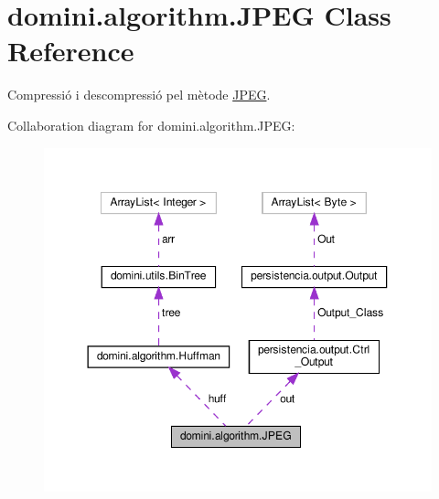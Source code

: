 \hypertarget{classdomini_1_1algorithm_1_1JPEG}{}\section{domini.\+algorithm.\+J\+P\+EG Class Reference}
\label{classdomini_1_1algorithm_1_1JPEG}


Compressió i descompressió pel mètode \hyperlink{classdomini_1_1algorithm_1_1JPEG}{J\+P\+EG}.  




Collaboration diagram for domini.\+algorithm.\+J\+P\+EG\+:
\nopagebreak
\begin{figure}[H]
\begin{center}
\leavevmode
\includegraphics[width=350pt]{classdomini_1_1algorithm_1_1JPEG__coll__graph}
\end{center}
\end{figure}
